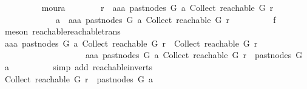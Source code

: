 \begin{isabellebody}
\ \ \ \ \ \ \ \ \isamarkupfalse%
\ moura\isanewline
\ \ \ \ \ \ \isamarkupfalse%
\ {\isachardoublequoteopen}r\ {\isasymrightarrow}\isactrlsup {\isacharasterisk}{\kern0pt}\ aaa\ {\isacharparenleft}{\kern0pt}past{\isacharunderscore}{\kern0pt}nodes\ G\ a{\isacharparenright}{\kern0pt}\ {\isacharparenleft}{\kern0pt}Collect\ {\isacharparenleft}{\kern0pt}reachable\ G\ r{\isacharparenright}{\kern0pt}{\isacharparenright}{\kern0pt}\isanewline
\ \ \ \ \ \ \ \ \ \ \ \ {\isasymlongrightarrow}\ a\ {\isasymrightarrow}\isactrlsup {\isacharplus}{\kern0pt}\ aaa\ {\isacharparenleft}{\kern0pt}past{\isacharunderscore}{\kern0pt}nodes\ G\ a{\isacharparenright}{\kern0pt}\ {\isacharparenleft}{\kern0pt}Collect\ {\isacharparenleft}{\kern0pt}reachable\ G\ r{\isacharparenright}{\kern0pt}{\isacharparenright}{\kern0pt}{\isachardoublequoteclose}\isanewline
\ \ \ \ \ \ \ \ \isamarkupfalse%
\ f{}\ \isamarkupfalse%
\ {\isacharparenleft}{\kern0pt}meson\ reachable{}{\isacharunderscore}{\kern0pt}reachable{\isacharunderscore}{\kern0pt}trans{\isacharparenright}{\kern0pt}\isanewline
\ \ \ \ \ \ \isamarkupfalse%
\ \isamarkupfalse%
\ {\isachardoublequoteopen}aaa\ {\isacharparenleft}{\kern0pt}past{\isacharunderscore}{\kern0pt}nodes\ G\ a{\isacharparenright}{\kern0pt}\ {\isacharparenleft}{\kern0pt}Collect\ {\isacharparenleft}{\kern0pt}reachable\ G\ r{\isacharparenright}{\kern0pt}{\isacharparenright}{\kern0pt}\ {\isasymnotin}\ Collect\ {\isacharparenleft}{\kern0pt}reachable\ G\ r{\isacharparenright}{\kern0pt}\isanewline
\ \ \ \ \ \ \ \ \ \ \ \ \ \ \ \ \ \ \ {\isasymor}\ aaa\ {\isacharparenleft}{\kern0pt}past{\isacharunderscore}{\kern0pt}nodes\ G\ a{\isacharparenright}{\kern0pt}\ {\isacharparenleft}{\kern0pt}Collect\ {\isacharparenleft}{\kern0pt}reachable\ G\ r{\isacharparenright}{\kern0pt}{\isacharparenright}{\kern0pt}\ {\isasymin}\ past{\isacharunderscore}{\kern0pt}nodes\ G\ a{\isachardoublequoteclose}\isanewline
\ \ \ \ \ \ \ \ \isamarkupfalse%
\ {\isacharparenleft}{\kern0pt}simp\ add{\isacharcolon}{\kern0pt}\ reachable{\isacharunderscore}{\kern0pt}in{\isacharunderscore}{\kern0pt}verts{\isacharparenleft}{\kern0pt}{}{\isacharparenright}{\kern0pt}{\isacharparenright}{\kern0pt}\isanewline
\ \ \ \ \ \ \isamarkupfalse%
\ \isamarkupfalse%
\ {\isachardoublequoteopen}Collect\ {\isacharparenleft}{\kern0pt}reachable\ G\ r{\isacharparenright}{\kern0pt}\ {\isasymsubseteq}\ past{\isacharunderscore}{\kern0pt}nodes\ G\ a{\isachardoublequoteclose}\isanewline

\end{isabellebody}
